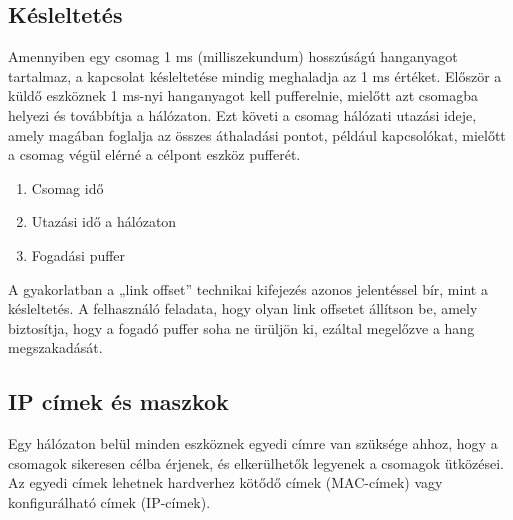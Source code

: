 \subsection{Késleltetés}
Amennyiben egy csomag 1 ms (milliszekundum) hosszúságú hanganyagot tartalmaz, 
a kapcsolat késleltetése mindig meghaladja az 1 ms értéket. 
Először a küldő eszköznek 1 ms-nyi hanganyagot kell pufferelnie, mielőtt 
azt csomagba helyezi és továbbítja a hálózaton. Ezt követi a csomag hálózati 
utazási ideje, amely magában foglalja az összes áthaladási pontot, például kapcsolókat, 
mielőtt a csomag végül elérné a célpont eszköz pufferét.
\begin{enumerate}
    \item Csomag idő
    \item Utazási idő a hálózaton
    \item Fogadási puffer
\end{enumerate}
A gyakorlatban a „link offset” technikai kifejezés azonos jelentéssel bír, mint a késleltetés. A felhasználó feladata, 
hogy olyan link offsetet állítson be, amely biztosítja, hogy a fogadó puffer soha ne ürüljön ki, ezáltal megelőzve a hang megszakadását.
\subsection{IP címek és maszkok}
Egy hálózaton belül minden eszköznek egyedi címre van szüksége ahhoz, hogy a csomagok sikeresen célba érjenek, 
és elkerülhetők legyenek a csomagok ütközései. 
Az egyedi címek lehetnek hardverhez kötődő címek (MAC-címek) vagy konfigurálható címek (IP-címek).
